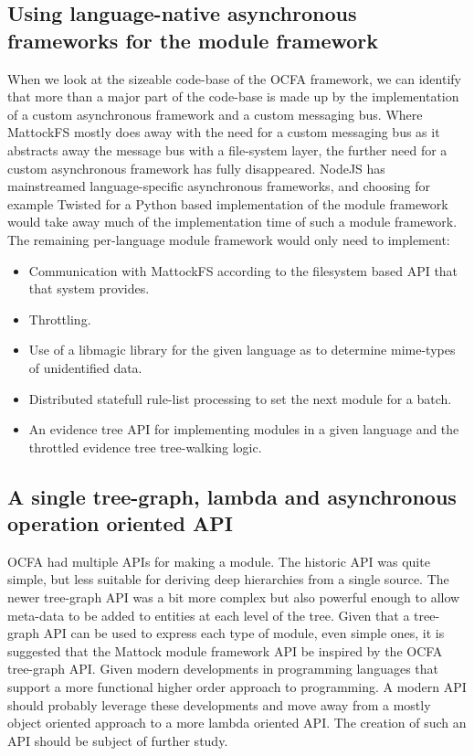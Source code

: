\subsection{Using language-native asynchronous frameworks for the module framework}
When we look at the sizeable code-base of the OCFA framework, we can identify that more than a major part of the code-base is made up by the implementation of a custom asynchronous framework and a custom messaging bus. Where MattockFS mostly does away with the need for a custom messaging bus as it abstracts away the message bus with a file-system layer, the further need for a custom asynchronous framework has fully disappeared. NodeJS has mainstreamed language-specific asynchronous frameworks, and choosing for example Twisted for a Python based implementation of the module framework would take away much of the implementation time of such a module framework. The remaining per-language module framework would only need to implement:
\begin{itemize}
\item Communication with MattockFS according to the filesystem  based API that that system provides.
\item Throttling.
\item Use of a libmagic library for the given language as to determine mime-types of unidentified data.
\item Distributed statefull rule-list processing to set the next module for a batch.
\item An evidence tree API for implementing modules in a given language and the throttled evidence tree tree-walking logic.
\end{itemize}
\subsection{A single tree-graph, lambda and asynchronous operation oriented API}
OCFA had multiple APIs for making a module. The historic API was quite simple, but less suitable for deriving deep hierarchies from a single source. The newer tree-graph API was a bit more complex but also powerful enough to allow meta-data to be added to entities at each level of the tree. Given that a tree-graph API can be used to express each type of module, even simple ones, it is suggested that the Mattock module framework API be inspired by the OCFA tree-graph API. Given modern developments in programming languages that support a more functional higher order approach to programming. A modern API should probably leverage these developments and move away from a mostly object oriented approach to a more lambda oriented API. The creation of such an API should be subject of further study.
